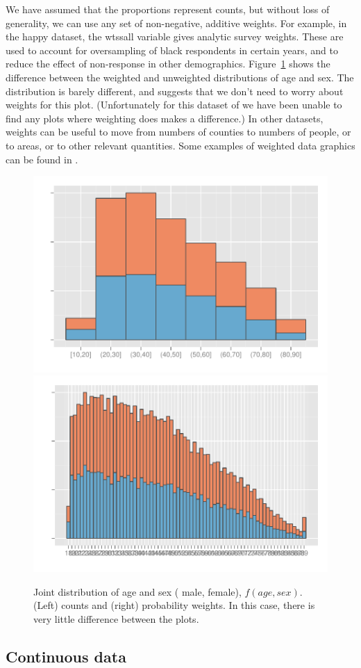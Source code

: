 \documentclass[journal]{vgtc}
\newcommand{\key}[1]
  {\protect \tikz{\fill[#1] rectangle (1ex,1ex);}}
\begin{document}
We have assumed that the proportions represent counts, but without loss of generality, we can use any set of non-negative, additive weights. For example, in the happy dataset, the {\sf wtssall} variable gives analytic survey weights. These are used to account for oversampling of black respondents in certain years, and to reduce the effect of non-response in other demographics. Figure~\ref{fig:weighting} shows the difference between the weighted and unweighted distributions of age and sex. The distribution is barely different, and suggests that we don't need to worry about weights for this plot. (Unfortunately for this dataset of we have been unable to find any plots where weighting does makes a difference.)  In other datasets, weights can be useful to move from numbers of counties to numbers of people, or to areas, or to other relevant quantities. Some examples of weighted data graphics can be found in \citep{unwin:1998,unwin:2003aa,unwin:2006}.

\begin{figure}[htbp]
  \centering
    \includegraphics[width=0.5\linewidth]{wt-count}%
    \includegraphics[width=0.5\linewidth]{wt-wtssall}%
  \caption{Joint distribution of age and sex (\key{male} male, \key{female} female), $f(age, sex)$. (Left) counts and (right) probability weights. In this case, there is very little difference between the plots.}
  \label{fig:weighting}
\end{figure}

\subsection{Continuous data}
\label{sub:continuous_data}
\end{document}
